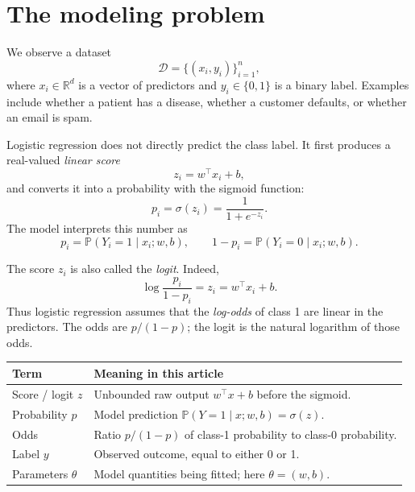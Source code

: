 \documentclass[11pt]{article}
\newcommand{\rowrule}{\specialrule{0.20pt}{1.25pt}{1.25pt}}
\newcommand{\R}{\mathbb{R}}
\newcommand{\Prob}{\mathbb{P}}
\newcommand{\sigmoid}{\sigma}
\theoremstyle{definition}
\begin{document}
\begingroup
\small
\tableofcontents
\endgroup
\newpage

\section{The modeling problem}

We observe a dataset
\[
\mathcal{D}=\{(x_i,y_i)\}_{i=1}^{n},
\]
where $x_i\in\R^d$ is a vector of predictors and $y_i\in\{0,1\}$ is a binary label. Examples include whether a patient has a disease, whether a customer defaults, or whether an email is spam.

Logistic regression does not directly predict the class label. It first produces a real-valued \emph{linear score}
\begin{equation}
z_i=w^\top x_i+b,
\label{eq:linear-score}
\end{equation}
and converts it into a probability with the sigmoid function:
\begin{equation}
p_i=\sigmoid(z_i)=\frac{1}{1+e^{-z_i}}.
\label{eq:sigmoid}
\end{equation}
The model interprets this number as
\[
p_i=\Prob(Y_i=1\mid x_i;w,b),
\qquad
1-p_i=\Prob(Y_i=0\mid x_i;w,b).
\]

The score $z_i$ is also called the \emph{logit}. Indeed,
\begin{equation}
\log\frac{p_i}{1-p_i}=z_i=w^\top x_i+b.
\label{eq:logodds}
\end{equation}
Thus logistic regression assumes that the \emph{log-odds} of class 1 are linear in the predictors. The odds are $p/(1-p)$; the logit is the natural logarithm of those odds.

\begin{center}
\begin{tabularx}{0.94\textwidth}{>{\raggedright\arraybackslash}p{} X}
\toprule
\textbf{Term} & \textbf{Meaning in this article} \\
\midrule
Score / logit $z$ & Unbounded raw output $w^\top x+b$ before the sigmoid. \\
\rowrule
Probability $p$ & Model prediction $\Prob(Y=1\mid x;w,b)=\sigmoid(z)$. \\
\rowrule
Odds & Ratio $p/(1-p)$ of class-1 probability to class-0 probability. \\
\rowrule
Label $y$ & Observed outcome, equal to either 0 or 1. \\
\rowrule
Parameters $\theta$ & Model quantities being fitted; here $\theta=(w,b)$. \\
\bottomrule
\end{tabularx}
\end{center}
\end{document}
